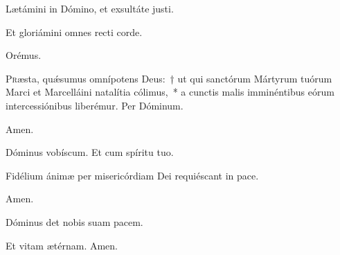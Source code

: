     
  \vv  Lætámini in Dómino, et exsultáte justi.
    
\rr Et gloriámini omnes recti corde.

Orémus.

\lettrine{P}{r}æsta, quǽsumus omnípotens Deus:~† ut qui sanctórum Mártyrum tuórum Marci et Marcelláini natalítia cólimus,~* a cunctis malis imminéntibus eórum intercessiónibus liberémur. Per Dóminum.

\rr Amen.
   
      \vv Dóminus vobíscum. \rr Et cum spíritu tuo.
   
   
     \vv Fidélium ánimæ per misericórdiam Dei requiéscant in pace.
  
  \rr Amen.
  
  
  \secreto
  
\vv Dóminus det nobis suam pacem.
  
\rr Et vitam ætérnam. Amen.

